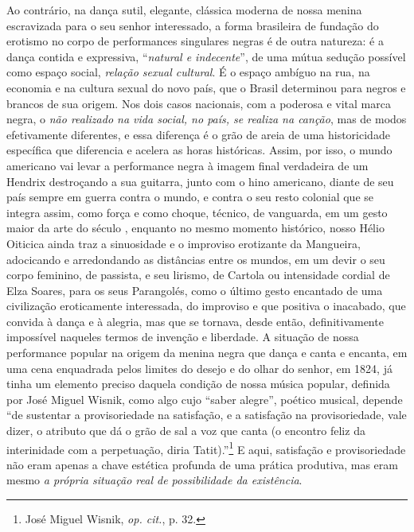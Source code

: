 Ao contrário, na dança sutil, elegante, clássica moderna de nossa menina
escravizada para o seu senhor interessado, a forma brasileira de
fundação do erotismo no corpo de performances singulares negras é de
outra natureza: é a dança contida e expressiva, ``\emph{natural e
indecente}'', de uma mútua sedução possível como espaço social,
\emph{relação sexual cultural}. É o espaço ambíguo na rua, na economia e
na cultura sexual do novo país, que o Brasil determinou para negros e
brancos de sua origem. Nos dois casos nacionais, com a poderosa e vital
marca negra, o \emph{não realizado na vida social, no país, se realiza
na canção}, mas de modos efetivamente diferentes, e essa diferença é o
grão de areia de uma historicidade específica que diferencia e acelera
as horas históricas. Assim, por isso, o mundo americano vai levar a
performance negra à imagem final verdadeira de um Hendrix destroçando a
sua guitarra, junto com o hino americano, diante de seu país sempre em
guerra contra o mundo, e contra o seu resto colonial que se integra
assim, como força e como choque, técnico, de vanguarda, em um gesto
maior da arte do século , enquanto no mesmo momento histórico, nosso
Hélio Oiticica ainda traz a sinuosidade e o improviso erotizante da
Mangueira, adocicando e arredondando as distâncias entre os mundos, em
um devir o seu corpo feminino, de passista, e seu lirismo, de Cartola ou
intensidade cordial de Elza Soares, para os seus Parangolés, como o
último gesto encantado de uma civilização eroticamente interessada, do
improviso e que positiva o inacabado, que convida à dança e à alegria,
mas que se tornava, desde então, definitivamente impossível naqueles
termos de invenção e liberdade. A situação de nossa performance popular
na origem da menina negra que dança e canta e encanta, em uma cena
enquadrada pelos limites do desejo e do olhar do senhor, em 1824, já
tinha um elemento preciso daquela condição de nossa música popular,
definida por José Miguel Wisnik, como algo cujo ``saber alegre'',
poético musical, depende ``de sustentar a provisoriedade na satisfação,
e a satisfação na provisoriedade, vale dizer, o atributo que dá o grão
de sal a voz que canta (o encontro feliz da interinidade com a
perpetuação, diria Tatit).''\footnote{José Miguel Wisnik, \emph{op.
  cit.}, p. 32.} E aqui, satisfação e provisoriedade não eram apenas a
chave estética profunda de uma prática produtiva, mas eram mesmo \emph{a
própria situação real de possibilidade da existência}.

